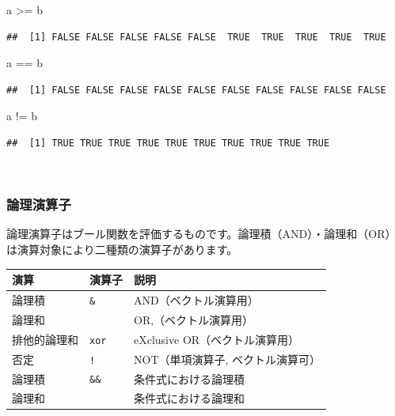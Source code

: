 \documentclass[
  12pt,
]{book}
\newenvironment{Shaded}{\begin{snugshade}}{\end{snugshade}}
\newcommand{\NormalTok}[1]{#1}
\newcommand{\SpecialCharTok}[1]{\textcolor[rgb]{0.00,0.00,0.00}{#1}}
\begin{document}
\begin{Shaded}
\begin{Highlighting}[numbers=left,,]
\NormalTok{a }\SpecialCharTok{\textgreater{}=}\NormalTok{ b}
\end{Highlighting}
\end{Shaded}

\begin{verbatim}
##  [1] FALSE FALSE FALSE FALSE FALSE  TRUE  TRUE  TRUE  TRUE  TRUE
\end{verbatim}

\begin{Shaded}
\begin{Highlighting}[numbers=left,,]
\NormalTok{a }\SpecialCharTok{==}\NormalTok{ b}
\end{Highlighting}
\end{Shaded}

\begin{verbatim}
##  [1] FALSE FALSE FALSE FALSE FALSE FALSE FALSE FALSE FALSE FALSE
\end{verbatim}

\begin{Shaded}
\begin{Highlighting}[numbers=left,,]
\NormalTok{a }\SpecialCharTok{!=}\NormalTok{ b}
\end{Highlighting}
\end{Shaded}

\begin{verbatim}
##  [1] TRUE TRUE TRUE TRUE TRUE TRUE TRUE TRUE TRUE TRUE
\end{verbatim}

　

\hypertarget{ux8ad6ux7406ux6f14ux7b97ux5b50}{%
\subsubsection{論理演算子}\label{ux8ad6ux7406ux6f14ux7b97ux5b50}}

論理演算子はブール関数を評価するものです。論理積（AND）・論理和（OR）は演算対象により二種類の演算子があります。 　

\begin{longtable}[]{@{}lll@{}}
\toprule
演算 & 演算子 & 説明 \\
\midrule
\endhead
論理積 & \texttt{\&} & AND（ベクトル演算用） \\
論理和 & \texttt{\textbar{}} & OR,（ベクトル演算用） \\
排他的論理和 & \texttt{xor} & eXclusive OR（ベクトル演算用） \\
否定 & \texttt{!} & NOT（単項演算子, ベクトル演算可） \\
論理積 & \texttt{\&\&} & 条件式における論理積 \\
論理和 & \texttt{\textbar{}\textbar{}} & 条件式における論理和 \\
\bottomrule
\end{longtable}
\end{document}
